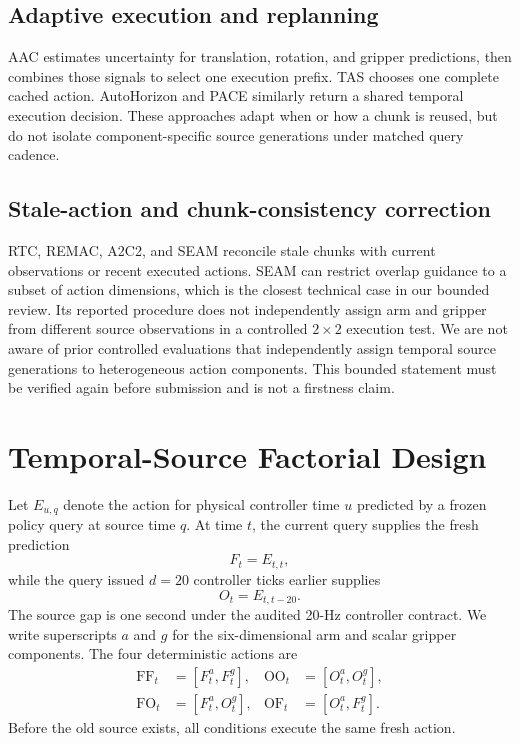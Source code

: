 \subsection{Adaptive execution and replanning}

AAC estimates uncertainty for translation, rotation, and gripper predictions,
then combines those signals to select one execution prefix. TAS chooses one
complete cached action. AutoHorizon and PACE similarly return a shared temporal
execution decision. These approaches adapt when or how a chunk is reused, but
do not isolate component-specific source generations under matched query
cadence.

\subsection{Stale-action and chunk-consistency correction}

RTC, REMAC, A2C2, and SEAM reconcile stale chunks with current observations or
recent executed actions. SEAM can restrict overlap guidance to a subset of
action dimensions, which is the closest technical case in our bounded review.
Its reported procedure does not independently assign arm and gripper from
different source observations in a controlled $2\times2$ execution test. We are
not aware of prior controlled evaluations that independently assign temporal
source generations to heterogeneous action components. This bounded statement
must be verified again before submission and is not a firstness claim.

\section{Temporal-Source Factorial Design}

Let $E_{u,q}$ denote the action for physical controller time $u$ predicted by a
frozen policy query at source time $q$. At time $t$, the current query supplies
the fresh prediction
\begin{equation}
F_t=E_{t,t},
\end{equation}
while the query issued $d=20$ controller ticks earlier supplies
\begin{equation}
O_t=E_{t,t-20}.
\end{equation}
The source gap is one second under the audited 20-Hz controller contract. We
write superscripts $a$ and $g$ for the six-dimensional arm and scalar gripper
components. The four deterministic actions are
\begin{align}
\mathrm{FF}_t&=[F_t^a,F_t^g], &
\mathrm{OO}_t&=[O_t^a,O_t^g],\\
\mathrm{FO}_t&=[F_t^a,O_t^g], &
\mathrm{OF}_t&=[O_t^a,F_t^g].
\end{align}
Before the old source exists, all conditions execute the same fresh action.

